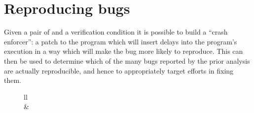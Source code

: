 \chapter{Reproducing bugs}
\label{sect:reproducing_bugs}

Given a pair of {\StateMachines} and a verification condition it is
possible to build a ``crash enforcer'': a patch to the program which
will insert delays into the program's execution in a way which will
make the bug more likely to reproduce.  This can then be used to
determine which of the many bugs reported by the prior analysis are
actually reproducible, and hence to appropriately target efforts in
fixing them.

\begin{figure}
  \begin{tabular}{ll}
    \\
    \hspace{-5mm} & \hspace{-5mm}%
    \\
    \hspace{-5mm}
\end{tabular}
\end{figure}
